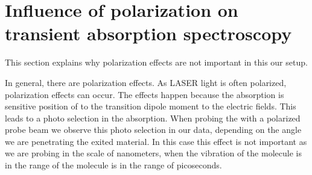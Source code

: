 \section[Polarization effects]{Influence of polarization on transient absorption spectroscopy}
\label{sec:TheoPolarization}

This section explains why polarization effects are not important in this our setup.

In general, there are polarization effects. As LASER light is often polarized, polarization effects can occur. The effects happen because
the absorption is sensitive position of to the transition dipole moment to the electric fields. This leads to a photo selection in the absorption. When probing the with a polarized probe beam 
we observe this photo selection in our data, depending on the angle we are penetrating the exited material. In this case this effect is not important as we are probing in the scale of nanometers, when the vibration of the molecule is in the range of
the molecule is in the range of picoseconds.

